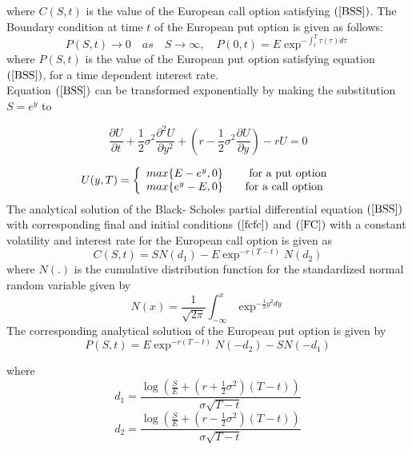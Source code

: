 \documentclass[12pt]{article}
\numberwithin{equation}{subsection} %
\begin{document}
where $C(S,t)$ is the value of the European call option satisfying
$(\ref{BSS})$. The Boundary condition  at time $t$ of the European
put option is given as follows:
 \begin{equation}\label{FC}
P(S,t)\rightarrow 0 \quad as \quad S\rightarrow\infty    ,\quad
P(0,t)=E\exp^{-{\int_{t}^{T}}\tau(\tau)d\tau}
\end{equation}
where $P(S,t)$ is the value of the European put  option
satisfying equation $(\ref{BSS})$, for a time dependent interest rate.\\
 Equation $(\ref{BSS})$ can be transformed exponentially by making the
substitution $S=e^y$ to

 \begin{equation}
\frac{\partial U}{\partial
t}+\frac{1}{2}\sigma^2\frac{\partial^2U}{\partial
y^2}+(r-\frac{1}{2}\sigma^2\frac{\partial U}{\partial y})-rU=0
\end{equation}

\[U(y,T) = \left\{
\begin{array}{l l}\label{INC}
  max\{E-e^y,0\} & \quad \mbox{ for a put option}\\
  max\{e^y-E,0\}& \quad \mbox{for a call option}\\ \end{array} \right. \]
The analytical solution of the Black- Scholes partial differential
equation $(\ref{BSS})$ with corresponding final and initial
conditions $(\ref{fcfc})$ and $(\ref{FC})$ with a constant
volatility and interest rate
 for the European call option is given as\cite{Wilmot}
\begin{equation}
C(S,t)=SN(d_1)-E\exp^{-r(T-t)}N(d_2)
\end{equation}
where $N(.)$ is the cumulative  distribution function for the
standardized normal random variable given by
\begin{equation}
N(x)=\frac{1}{\sqrt{2\pi}}\int^{x}_{-\infty}\exp^{-\frac{1}{2}y^2dy}
\end{equation}
The corresponding analytical solution of the European put option is
given by
\begin{equation}
P(S,t)=E\exp^{-r(T-t)}N(-d_2)-SN(-d_1)
\end{equation}


where\\
\begin{equation*}
d_1=\frac{\log(\frac{S}{E}+(r+\frac{1}{2}\sigma^2)(T-t))}{\sigma\sqrt{T-t}}
\end{equation*}
\begin{equation*}
d_2=\frac{\log(\frac{S}{E}+(r-\frac{1}{2}\sigma^2)(T-t))}{\sigma\sqrt{T-t}}
\end{equation*}
\end{document}
